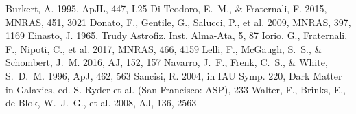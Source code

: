 \documentclass[twocolumn]{aastex701}
\begin{document}

\begin{thebibliography}{}
 Burkert, A. 1995, ApJL, 447, L25
 Di Teodoro, E.~M., \& Fraternali, F. 2015, MNRAS, 451, 3021
 Donato, F., Gentile, G., Salucci,
P., et al. 2009, MNRAS, 397, 1169
 Einasto, J. 1965, Trudy Astrofiz. Inst.
Alma-Ata, 5, 87
 Iorio, G., Fraternali, F., Nipoti, C., et al. 2017, MNRAS, 466, 4159
 Lelli, F., McGaugh, S.~S., \&
Schombert, J.~M. 2016, AJ, 152, 157
 Navarro, J.~F., Frenk, C.~S., \&
White, S.~D.~M. 1996, ApJ, 462, 563
 Sancisi, R. 2004, in IAU Symp. 220,
Dark Matter in Galaxies, ed. S. Ryder et al. (San Francisco: ASP), 233
 Walter, F., Brinks, E., de Blok, W.~J.~G., et al. 2008, AJ, 136, 2563
\end{thebibliography}
\end{document}
